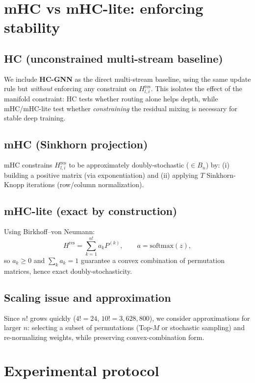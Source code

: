 \documentclass[11pt]{article}
\begin{document}
\section{mHC vs mHC-lite: enforcing stability}
\subsection{HC (unconstrained multi-stream baseline)}
We include \textbf{HC-GNN} as the direct multi-stream baseline, using the same update rule but \emph{without} enforcing any constraint on $H^{\mathrm{res}}_{l,i}$.
This isolates the effect of the manifold constraint: HC tests whether routing alone helps depth, while mHC/mHC-lite test whether \emph{constraining} the residual mixing is necessary for stable deep training.

\subsection{mHC (Sinkhorn projection)}
mHC constrains $H^{\mathrm{res}}_{l,i}$ to be approximately doubly-stochastic ($\in B_n$) by:
(i) building a positive matrix (via exponentiation) and
(ii) applying $T$ Sinkhorn-Knopp iterations (row/column normalization).

\subsection{mHC-lite (exact by construction)}
Using Birkhoff--von Neumann:
\[
H^{\mathrm{res}}=\sum_{k=1}^{n!}a_kP^{(k)},\qquad a=\mathrm{softmax}(z),
\]
so $a_k\ge 0$ and $\sum_k a_k=1$ guarantee a convex combination of permutation matrices, hence exact doubly-stochasticity.

\subsection{Scaling issue and approximation}
Since $n!$ grows quickly ($4!=24$, $10!=3{,}628{,}800$), we consider approximations for larger $n$:
selecting a subset of permutations (Top-$M$ or stochastic sampling) and re-normalizing weights, while preserving convex-combination form.

\section{Experimental protocol}
\end{document}
